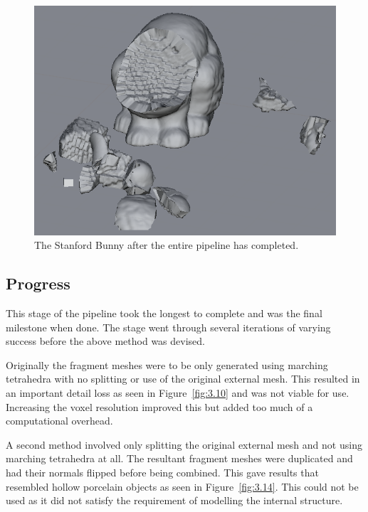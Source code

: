 \begin{figure}
\centerline{\includegraphics[scale=0.75]{collision.png}}
\caption{The Stanford Bunny after the entire pipeline has completed.}
\label{fig:3.13}
\end{figure}

\subsection{Progress}

This stage of the pipeline took the longest to complete and was the final milestone when done. The stage went through several iterations of varying success before the above method was devised.

Originally the fragment meshes were to be only generated using marching tetrahedra with no splitting or use of the original external mesh. This resulted in an important detail loss as seen in Figure~\ref{fig:3.10} and was not viable for use. Increasing the voxel resolution improved this but added too much of a computational overhead.

A second method involved only splitting the original external mesh and not using marching tetrahedra at all. The resultant fragment meshes were duplicated and had their normals flipped before being combined. This gave results that resembled hollow porcelain objects as seen in Figure~\ref{fig:3.14}. This could not be used as it did not satisfy the requirement of modelling the internal structure.

